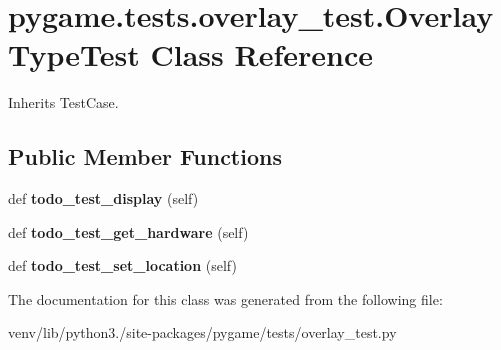 \hypertarget{classpygame_1_1tests_1_1overlay__test_1_1_overlay_type_test}{}\section{pygame.\+tests.\+overlay\+\_\+test.\+Overlay\+Type\+Test Class Reference}
\label{classpygame_1_1tests_1_1overlay__test_1_1_overlay_type_test}


Inherits Test\+Case.

\subsection*{Public Member Functions}
\begin{DoxyCompactItemize}
\item 
\mbox{\label{classpygame_1_1tests_1_1overlay__test_1_1_overlay_type_test_a3cf1563dd6615be9464f00503043ceba}} 
def {\bfseries todo\+\_\+test\+\_\+display} (self)
\item 
\mbox{\label{classpygame_1_1tests_1_1overlay__test_1_1_overlay_type_test_ac4c5dbaa4d75dc4b28ef14c7357a67b0}} 
def {\bfseries todo\+\_\+test\+\_\+get\+\_\+hardware} (self)
\item 
\mbox{\label{classpygame_1_1tests_1_1overlay__test_1_1_overlay_type_test_a3da6c59b1a6386a87b228a4b1ba548c4}} 
def {\bfseries todo\+\_\+test\+\_\+set\+\_\+location} (self)
\end{DoxyCompactItemize}


The documentation for this class was generated from the following file\+:\begin{DoxyCompactItemize}
\item 
venv/lib/python3./site-\/packages/pygame/tests/overlay\+\_\+test.\+py\end{DoxyCompactItemize}
